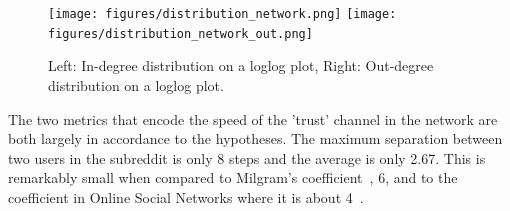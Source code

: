 \documentclass[noacm,sigconf,authorversion]{acmart}
\begin{document}
\begin{figure}[h!]       
    \mbox{\texttt{[image: figures/distribution\_network.png]}}
    \mbox{\texttt{[image: figures/distribution\_network\_out.png]}}
    \caption{Left: In-degree distribution on a loglog plot, Right: Out-degree distribution on a loglog plot.}
    \label{fig:deg_distr}
\end{figure}

The two metrics that encode the speed of the 'trust' channel in the network are both largely in accordance to the hypotheses. The maximum separation between two users in the subreddit is only 8 steps and the average is only 2.67. This is remarkably small when compared to Milgram's coefficient~\cite{travers2011experimental}, 6, and to the coefficient in Online Social Networks where it is about 4~\cite{szule2014lost}. 

\begin{table}
 \begin{center}
\end{center}
 \caption{Table containing statistics for the subnetwork.}
 \label{tab:stats}
\end{table}
\end{document}
